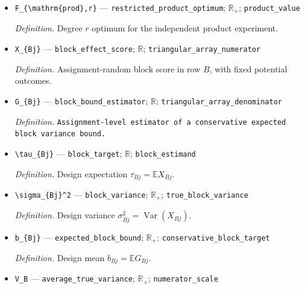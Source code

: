 \documentclass{article}
\begin{document}
\begin{itemize}
  \par\smallskip\noindent\emph{Definition.} \texttt{All-\allowbreak{}degree optimum for the independent product experiment.}
  \item \texttt{F\_\allowbreak{}\{\textbackslash{}\allowbreak{}mathrm\{prod\}\allowbreak{},\allowbreak{}r\}\allowbreak{}} --- \texttt{restricted\_\allowbreak{}product\_\allowbreak{}optimum}; \(\mathbb R_+\); \texttt{product\_\allowbreak{}value}
  \par\smallskip\noindent\emph{Definition.} Degree \(r\) optimum for the independent product experiment.
  \item \texttt{X\_\allowbreak{}\{Bj\}\allowbreak{}} --- \texttt{block\_\allowbreak{}effect\_\allowbreak{}score}; \(\mathbb R\); \texttt{triangular\_\allowbreak{}array\_\allowbreak{}numerator}
  \par\smallskip\noindent\emph{Definition.} Assignment-random block score in row \(B\), with fixed potential outcomes.
  \item \texttt{G\_\allowbreak{}\{Bj\}\allowbreak{}} --- \texttt{block\_\allowbreak{}bound\_\allowbreak{}estimator}; \(\mathbb R\); \texttt{triangular\_\allowbreak{}array\_\allowbreak{}denominator}
  \par\smallskip\noindent\emph{Definition.} \texttt{Assignment-\allowbreak{}level estimator of a conservative expected block variance bound.}
  \item \texttt{\textbackslash{}\allowbreak{}tau\_\allowbreak{}\{Bj\}\allowbreak{}} --- \texttt{block\_\allowbreak{}target}; \(\mathbb R\); \texttt{block\_\allowbreak{}estimand}
  \par\smallskip\noindent\emph{Definition.} Design expectation \(\tau_{Bj}=\mathbb E X_{Bj}\).
  \item \texttt{\textbackslash{}\allowbreak{}sigma\_\allowbreak{}\{Bj\}\allowbreak{}\textasciicircum{}2} --- \texttt{block\_\allowbreak{}variance}; \(\mathbb R_+\); \texttt{true\_\allowbreak{}block\_\allowbreak{}variance}
  \par\smallskip\noindent\emph{Definition.} Design variance \(\sigma_{Bj}^2=\operatorname{Var}(X_{Bj})\).
  \item \texttt{b\_\allowbreak{}\{Bj\}\allowbreak{}} --- \texttt{expected\_\allowbreak{}block\_\allowbreak{}bound}; \(\mathbb R_+\); \texttt{conservative\_\allowbreak{}block\_\allowbreak{}target}
  \par\smallskip\noindent\emph{Definition.} Design mean \(b_{Bj}=\mathbb E G_{Bj}\).
  \item \texttt{V\_\allowbreak{}B} --- \texttt{average\_\allowbreak{}true\_\allowbreak{}variance}; \(\mathbb R_+\); \texttt{numerator\_\allowbreak{}scale}

\end{itemize}
\end{document}
